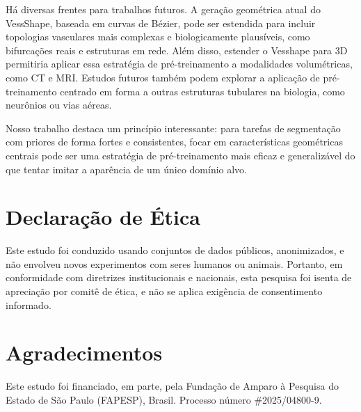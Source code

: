 \documentclass[%
reprint,
nofootinbib,
 amsmath,amssymb,
aps,
floatfix,
superscriptaddress,
showkeys,
longbibliography
]{revtex4-1}
\begin{document}
Há diversas frentes para trabalhos futuros. A geração geométrica atual do VessShape, baseada em curvas de Bézier, pode ser estendida para incluir topologias vasculares mais complexas e biologicamente plausíveis, como bifurcações reais e estruturas em rede. Além disso, estender o Vesshape para 3D permitiria aplicar essa estratégia de pré-treinamento a modalidades volumétricas, como CT e MRI. Estudos futuros também podem explorar a aplicação de pré-treinamento centrado em forma a outras estruturas tubulares na biologia, como neurônios ou vias aéreas.

Nosso trabalho destaca um princípio interessante: para tarefas de segmentação com priores de forma fortes e consistentes, focar em características geométricas centrais pode ser uma estratégia de pré-treinamento mais eficaz e generalizável do que tentar imitar a aparência de um único domínio alvo.


\section*{Declaração de Ética}

Este estudo foi conduzido usando conjuntos de dados públicos, anonimizados, e não envolveu novos experimentos com seres humanos ou animais. Portanto, em conformidade com diretrizes institucionais e nacionais, esta pesquisa foi isenta de apreciação por comitê de ética, e não se aplica exigência de consentimento informado.

\section*{Agradecimentos}
Este estudo foi financiado, em parte, pela Fundação de Amparo à Pesquisa do Estado de São Paulo (FAPESP), Brasil. Processo número \#2025/04800-9.


\end{document}
